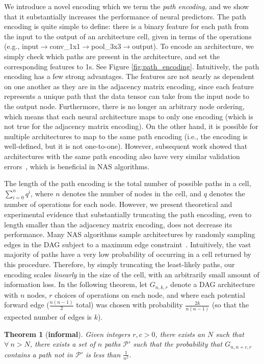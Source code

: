 \documentclass[11pt]{article}
\numberwithin{equation}{section}
\numberwithin{figure}{section}
\theoremstyle{plain}
\newtheorem{theorem}{Theorem}[section]
\theoremstyle{definition}
\begin{document}
We introduce a novel encoding which we term the \emph{path encoding},
and we show that it substantially increases the performance of neural predictors.
The path encoding is quite simple to define: there is a binary feature for each
path from the input to the output of an architecture cell,
given in terms of the operations
(e.g., input$\rightarrow$conv\_1x1$\rightarrow$pool\_3x3$\rightarrow$output). 
To encode an architecture, we simply check which paths are present in the architecture,
and set the corresponding features to 1s.
See Figure \ref{fig:path_encoding}.
Intuitively, the path encoding has a few strong advantages.
The features are not nearly as dependent on one another as they are in the adjacency
matrix encoding, since each feature represents a unique path that the data tensor can
take from the input node to the output node.
Furthermore, there is no longer an arbitrary node ordering, which means that
each neural architecture maps to only one encoding (which is not true for the
adjacency matrix encoding). On the other hand, it is possible for multiple
architectures to map to the same path encoding
(i.e., the encoding is well-defined, but it is not one-to-one).
However, subsequent work showed that architectures
with the same path encoding also have very similar validation 
errors~\cite{white2020study}, which is beneficial in NAS algorithms.

The length of the path encoding is the total number of possible paths in a cell,
$\sum_{i=0}^n q^i$, where $n$ denotes
the number of nodes in the cell, and $q$ denotes the number
of operations for each node. 
However, we present theoretical and experimental evidence that substantially
truncating the path encoding, even to length smaller than the adjacency matrix encoding,
does not decrease its performance.
Many NAS algorithms sample architectures by randomly sampling edges in the DAG 
subject to a maximum edge constraint~\cite{nasbench}.
Intuitively, the vast majority of paths have a very low probability of occurring
in a cell returned by this procedure.
Therefore, by simply truncating the least-likely paths,
our encoding scales \emph{linearly} in the size of the cell,
with an arbitrarily small amount of information loss.
In the following theorem, let $G_{n, k, r}$ denote a DAG architecture with $n$ nodes,
$r$ choices of operations on each node, and where each potential forward edge 
($\frac{n(n-1)}{2}$ total) was chosen with probability $\frac{2k}{n(n-1)}$ 
(so that the expected number of edges is $k$).

\begin{theorem}[\textbf{informal}] \label{thm:path_length_informal}
Given integers $r, c>0$, there exists an $N$ such that
$\forall~n>N$, there exists a set of $n$ paths $\mathcal{P}'$
such that the probability that $G_{n,n+c,r}$ contains
a path not in $\mathcal{P}'$ is less than $\frac{1}{n^{2}}$.
\end{theorem}
\end{document}
